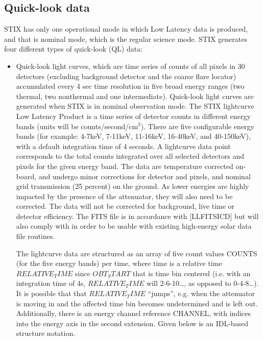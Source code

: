 \documentclass{aa}
\begin{document}
\subsection{Quick-look data}
STIX has only one operational mode in which Low Latency data is produced, and that is nominal mode, which is the regular science mode.
STIX generates four different types of quick-look (QL) data:
\begin{itemize}
                                                                                                                                                               \item Quick-look light curves, which are time series of counts
of all pixels in 30 detectors (excluding background detector and the coarse flare locator)
accumulated every 4 sec time resolution in five broad energy ranges (two thermal, two nonthermal
and one intermediate). Quick-look light curves are generated when STIX is in nominal observation mode.
The STIX lightcurve Low Latency Product is a time series of detector counts in different energy bands (units will be counts/second/cm$^2$). There are five configurable energy bands (for example: 4-7keV, 7-11keV, 11-16keV, 16-40keV, and 40-150keV), with a default integration time of 4 seconds. A lightcurve data point corresponds to the total counts integrated over all selected detectors and pixels for the given energy band. The data are temperature corrected on-board, and undergo minor corrections for detector and pixels,
and nominal grid transmission (25 percent) on the ground. As lower energies are highly impacted by the presence of the attenuator, they will also need to be corrected. The data will not be corrected for background, live time or detector efficiency. The FITS file is in accordance with [LLFITSICD] but will also comply with  in order to be usable with existing high-energy solar data file routines.

The lightcurve data are structured as an array of five count values COUNTS (for the five energy bands) per time, where time is a relative time $RELATIVE_TIME$ since $OBT_START$ that is time bin centered (i.e. with an integration time of 4s, $RELATIVE_TIME$ will 2-6-10…, as opposed to 0-4-8…). It is possible that that $RELATIVE_TIME$ “jumps”, e.g. when the attenuator is moving in and the affected time bin becomes undetermined and is left out. Additionally, there is an energy channel reference CHANNEL, with indices into the energy axis in the second extension. Given below is an IDL-based structure notation.


\end{itemize}
\end{document}
